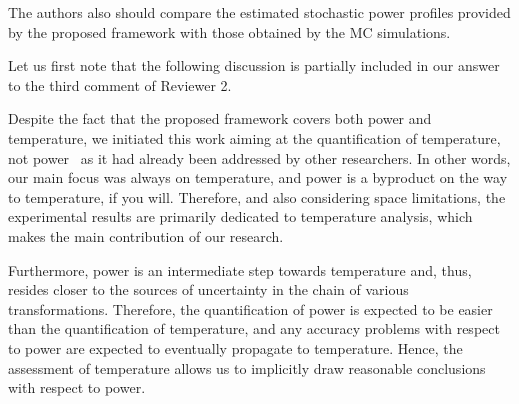 \begin{authors}
\begin{actions}
\end{actions}
\end{authors}

\begin{reviewer}
The authors also should compare the estimated stochastic power profiles provided by the proposed framework with those obtained by the MC simulations.
\end{reviewer}
\begin{authors}
Let us first note that the following discussion is partially included in our answer to the third comment of Reviewer 2.

Despite the fact that the proposed framework covers both power and temperature, we initiated this work aiming at the quantification of temperature, not power \perse\ as it had already been addressed by other researchers.
In other words, our main focus was always on temperature, and power is a byproduct on the way to temperature, if you will.
Therefore, and also considering space limitations, the experimental results are primarily dedicated to temperature analysis, which makes the main contribution of our research.

Furthermore, power is an intermediate step towards temperature and, thus, resides closer to the sources of uncertainty in the chain of various transformations.
Therefore, the quantification of power is expected to be easier than the quantification of temperature, and any accuracy problems with respect to power are expected to eventually propagate to temperature.
Hence, the assessment of temperature allows us to implicitly draw reasonable conclusions with respect to power.

\begin{actions}
\end{actions}
\end{authors}

